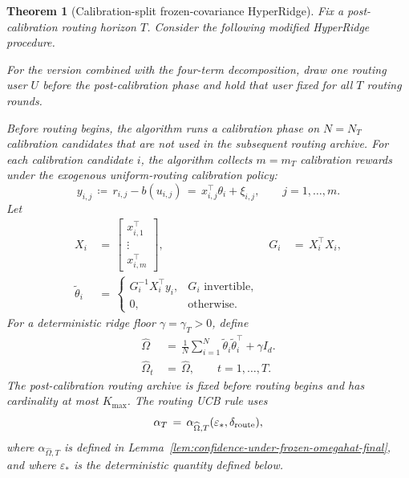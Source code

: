 \documentclass{article} %
\newtheorem{theorem}{Theorem}
\begin{document}
\begin{theorem}[Calibration-split frozen-covariance HyperRidge]
\label{thm:err-control-calibration-split-final}
Fix a post-calibration routing horizon \(T\).  Consider the following modified
HyperRidge procedure.

For the version combined with the four-term decomposition, draw one routing
user \(U\) before the post-calibration phase and hold that user fixed for all
\(T\) routing rounds.

Before routing begins, the algorithm runs a calibration phase on
\(N=N_T\) calibration candidates that are not used in the subsequent routing
archive.  For each calibration candidate \(i\), the algorithm collects
\(m=m_T\) calibration rewards under the exogenous uniform-routing calibration
policy:
\begin{equation}
y_{i,j}
\,\coloneqq\,
r_{i,j}-b(u_{i,j})
\,=\,
x_{i,j}^{\top}\theta_i+\xi_{i,j},
\qquad j=1,\ldots,m.
\end{equation}
Let
\begin{equation}
\begin{aligned}
X_i
&\,=\,
\begin{bmatrix}
x_{i,1}^{\top}\\
\vdots\\
x_{i,m}^{\top}
\end{bmatrix},
&
G_i
&\,=\,
X_i^\top X_i,
\\
\widetilde\theta_i
&\,=\,
\begin{cases}
G_i^{-1}X_i^\top y_i, & G_i\text{ invertible},\\
0, & \text{otherwise}.
\end{cases}
\end{aligned}
\end{equation}
For a deterministic ridge floor \(\gamma=\gamma_T>0\), define
\begin{equation}
\begin{aligned}
\widehat\Omega
&\,=\,
\frac1N\sum_{i=1}^N\widetilde\theta_i\widetilde\theta_i^\top+\gamma I_d.
\\
\widehat\Omega_t
&\,=\,
\widehat\Omega,
\qquad t=1,\ldots,T.
\end{aligned}
\end{equation}
The post-calibration routing archive is fixed before routing begins and has
cardinality at most \(K_{\max}\).  The routing UCB rule uses
\begin{equation}
\alpha_T
\,=\,
\alpha_{\widehat\Omega,T}(\varepsilon_*,\delta_{\rm route}),
\end{equation}
where \(\alpha_{\widehat\Omega,T}\) is defined in
Lemma~\ref{lem:confidence-under-frozen-omegahat-final}, and where
\(\varepsilon_*\) is the deterministic quantity defined below.


\end{theorem}
\end{document}
